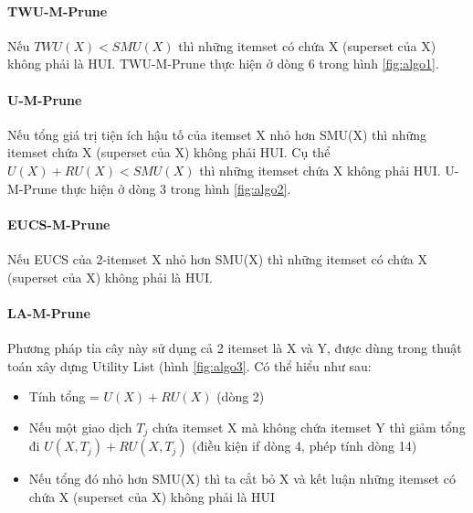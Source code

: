 
\paragraph{TWU-M-Prune} Nếu $TWU(X) < SMU(X)$ thì những itemset có chứa X (superset của X) không phải là HUI. TWU-M-Prune thực hiện ở dòng 6 trong hình \ref{fig:algo1}.

\paragraph{U-M-Prune} Nếu tổng giá trị tiện ích hậu tố của itemset X nhỏ hơn SMU(X) thì những itemset chứa X (superset của X) không phải HUI. Cụ thể $U(X) + RU(X) < SMU(X)$ thì những itemset chứa X không phải HUI. U-M-Prune thực hiện ở dòng 3 trong hình \ref{fig:algo2}.

\paragraph{EUCS-M-Prune} Nếu EUCS của 2-itemset X nhỏ hơn SMU(X) thì những itemset có chứa X (superset của X) không phải là HUI. 

\paragraph{LA-M-Prune} Phương pháp tỉa cây này sử dụng cả 2 itemset là X và Y, được dùng trong thuật toán xây dựng Utility List (hình \ref{fig:algo3}. Có thể hiểu như sau: 

\begin{itemize}
  \item Tính tổng = $U(X) + RU(X)$ (dòng 2)
  \item Nếu một giao dịch $T_j$ chứa itemset X mà không chứa itemset Y thì giảm tổng đi $U(X, T_j) + RU(X, T_j)$ (điều kiện if dòng 4, phép tính dòng 14) 
  \item Nếu tổng đó nhỏ hơn SMU(X) thì ta cắt bỏ X và kết luận những itemset có chứa X (superset của X) không phải là HUI
\end{itemize}
